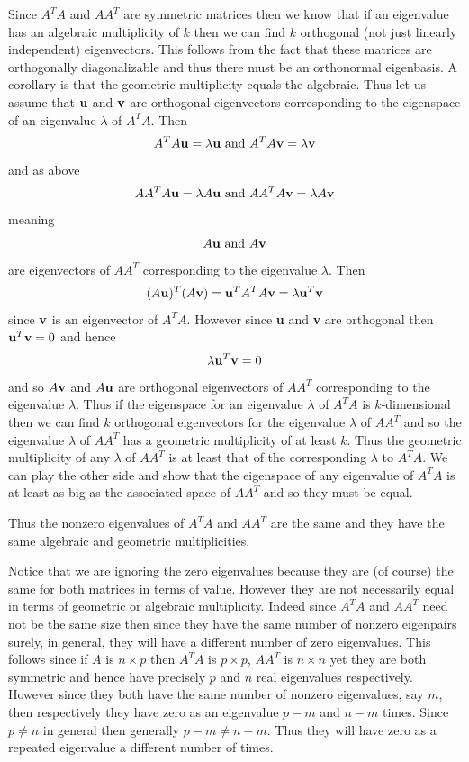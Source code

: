 \documentclass{book}
\begin{document}
{Since $A^TA$ and $AA^T$ are symmetric matrices then we know that if an eigenvalue has an algebraic multiplicity of $k$ then we can find $k$ orthogonal (not just linearly independent) eigenvectors. This follows from the fact that these matrices are orthogonally diagonalizable and thus there must be an orthonormal eigenbasis. A corollary is that the geometric multiplicity equals the algebraic. Thus let us assume that ${\bf u}$ and ${\bf v}$ are orthogonal eigenvectors corresponding to the eigenspace of an eigenvalue $\lambda$ of $A^TA$. Then
$$
A^TA{\bf u}=\lambda{\bf u}\text{ and } A^TA{\bf v}=\lambda{\bf v}
$$
and as above
$$
AA^TA{\bf u}=\lambda A{\bf u}\text{ and } AA^TA{\bf v}=\lambda A{\bf v}
$$
meaning
$$
A{\bf u}\text{ and }A{\bf v}
$$
are eigenvectors of $AA^T$ corresponding to the eigenvalue $\lambda$. Then 
$$
(A{\bf u})^T(A{\bf v})={\bf u}^TA^TA{\bf v}=\lambda {\bf u}^T{\bf v}
$$
since ${\bf v}$ is an eigenvector of $A^TA$. However since {\bf u} and {\bf v} are orthogonal then ${\bf u}^T{\bf v}=0$ and hence
$$
\lambda {\bf u}^T{\bf v}=0
$$
and so $A{\bf v}$ and $A{\bf u}$ are orthogonal eigenvectors of $AA^T$ corresponding to the eigenvalue $\lambda$. Thus if the eigenspace for an eigenvalue $\lambda$ of $A^TA$ is $k$-dimensional then we can find $k$ orthogonal eigenvectors for the eigenvalue $\lambda$ of $AA^T$ and so the eigenvalue $\lambda$ of $AA^T$ has a geometric multiplicity of at least $k$. Thus the geometric multiplicity of any $\lambda$ of $AA^T$ is at least that of the corresponding $\lambda$ to $A^TA$. We can play the other side and show that the eigenspace of any eigenvalue of $A^TA$ is at least as big as the associated space of $AA^T$ and so they must be equal. 

Thus the nonzero eigenvalues of $A^TA$ and $AA^T$ are the same and they have the same algebraic and geometric multiplicities.}

Notice that we are ignoring the zero eigenvalues because they are (of course) the same for both matrices in terms of value. However they are not necessarily equal in terms of geometric or algebraic multiplicity. Indeed since $A^TA$ and $AA^T$ need not be the same size then since they have the same number of nonzero eigenpairs surely, in general, they will have a different number of zero eigenvalues. This follows since if $A$ is $n \times p$ then $A^TA$ is $p \times p$, $AA^T$ is $n \times n$ yet they are both symmetric and hence have precisely $p$ and $n$ real eigenvalues respectively. However since they both have the same number of nonzero eigenvalues, say $m$, then respectively they have zero as an eigenvalue $p-m$ and $n-m$ times. Since $p\neq n$ in general then generally $p-m\neq n-m$. Thus they will have zero as a repeated eigenvalue a different number of times.
\end{document}
